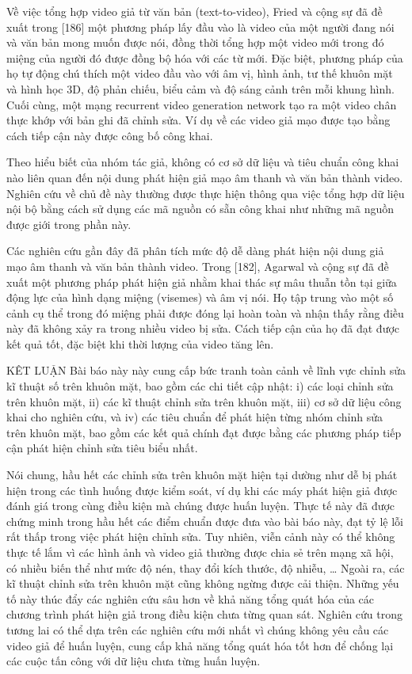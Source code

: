 \documentclass{article}
\begin{document}
Về việc tổng hợp video giả từ văn bản (text-to-video), Fried và cộng sự đã đề xuất trong [186] một phương pháp lấy đầu vào là video của một người đang nói và văn bản mong muốn được nói, đồng thời tổng hợp một video mới trong đó miệng của người đó được đồng bộ hóa với các từ mới. Đặc biệt, phương pháp của họ tự động chú thích một video đầu vào với âm vị, hình ảnh, tư thế khuôn mặt và hình học 3D, độ phản chiếu, biểu cảm và độ sáng cảnh trên mỗi khung hình. Cuối cùng, một mạng recurrent video generation network tạo ra một video chân thực khớp với bản ghi đã chỉnh sửa. Ví dụ về các video giả mạo được tạo bằng cách tiếp cận này được công bố công khai.

Theo hiểu biết của nhóm tác giả, không có cơ sở dữ liệu và tiêu chuẩn công khai nào liên quan đến nội dung phát hiện giả mạo âm thanh và văn bản thành video. Nghiên cứu về chủ đề này thường được thực hiện thông qua việc tổng hợp dữ liệu nội bộ bằng cách sử dụng các mã nguồn có sẵn công khai như những mã nguồn được giới trong phần này.

Các nghiên cứu gần đây đã phân tích mức độ dễ dàng phát hiện nội dung giả mạo âm thanh và văn bản thành video. Trong [182], Agarwal và cộng sự đã đề xuất một phương pháp phát hiện giả nhằm khai thác sự mâu thuẫn tồn tại giữa động lực của hình dạng miệng (visemes) và âm vị nói. Họ tập trung vào một số cảnh cụ thể trong đó miệng phải được đóng lại hoàn toàn và nhận thấy rằng điều này đã không xảy ra trong nhiều video bị sửa. Cách tiếp cận của họ đã đạt được kết quả tốt, đặc biệt khi thời lượng của video tăng lên.

KÊT LUẬN
Bài báo này này cung cấp bức tranh toàn cảnh về lĩnh vực chỉnh sửa kĩ thuật số trên khuôn mặt, bao gồm các chi tiết cập nhật: i) các loại chỉnh sửa trên khuôn mặt, ii) các kĩ thuật chỉnh sửa trên khuôn mặt, iii) cơ sở dữ liệu công khai cho nghiên cứu, và iv) các tiêu chuẩn để phát hiện từng nhóm chỉnh sửa trên khuôn mặt, bao gồm các kết quả chính đạt được bằng các phương pháp tiếp cận phát hiện chỉnh sửa tiêu biểu nhất.

Nói chung, hầu hết các chỉnh sửa trên khuôn mặt hiện tại dường như dễ bị phát hiện trong các tình huống được kiểm soát, ví dụ khi các máy phát hiện giả được đánh giá trong cùng điều kiện mà chúng được huấn luyện. Thực tế này đã được chứng minh trong hầu hết các điểm chuẩn được đưa vào bài báo này, đạt tỷ lệ lỗi rất thấp trong việc phát hiện chỉnh sửa. Tuy nhiên, viễn cảnh này có thể không thực tế lắm vì các hình ảnh và video giả thường được chia sẻ trên mạng xã hội, có nhiều biến thể như mức độ nén, thay đổi kích thước, độ nhiễu, … Ngoài ra, các kĩ thuật chỉnh sửa trên khuôn mặt cũng không ngừng được cải thiện. Những yếu tố này thúc đẩy các nghiên cứu sâu hơn về khả năng tổng quát hóa của các chương trình phát hiện giả trong điều kiện chưa từng quan sát. Nghiên cứu trong tương lai có thể dựa trên các nghiên cứu mới nhất vì chúng không yêu cầu các video giả để huấn luyện, cung cấp khả năng tổng quát hóa tốt hơn để chống lại các cuộc tấn công với dữ liệu chưa từng huấn luyện.
\end{document}
